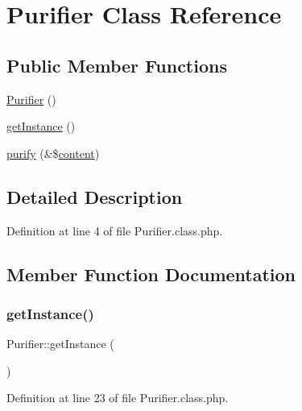 \hypertarget{classPurifier}{}\section{Purifier Class Reference}
\label{classPurifier}
\subsection*{Public Member Functions}
\begin{DoxyCompactItemize}
\item 
\hyperlink{classPurifier_a78c509e67fef53f3fabefb7a8ded9db6}{Purifier} ()
\item 
\hyperlink{classPurifier_ae552670dfe204024862ecd73c3082586}{get\+Instance} ()
\item 
\hyperlink{classPurifier_a8ef72146a37ba4e10453c9465835bd67}{purify} (\&\$\hyperlink{classcontent}{content})
\end{DoxyCompactItemize}


\subsection{Detailed Description}


Definition at line 4 of file Purifier.\+class.\+php.



\subsection{Member Function Documentation}
\hypertarget{classPurifier_ae552670dfe204024862ecd73c3082586}{}\label{classPurifier_ae552670dfe204024862ecd73c3082586} 
\subsubsection{\texorpdfstring{get\+Instance()}{getInstance()}}
{\footnotesize\ttfamily Purifier\+::get\+Instance (\begin{DoxyParamCaption}{ }\end{DoxyParamCaption})}



Definition at line 23 of file Purifier.\+class.\+php.

\hypertarget{classPurifier_a78c509e67fef53f3fabefb7a8ded9db6}{}\label{classPurifier_a78c509e67fef53f3fabefb7a8ded9db6} 
